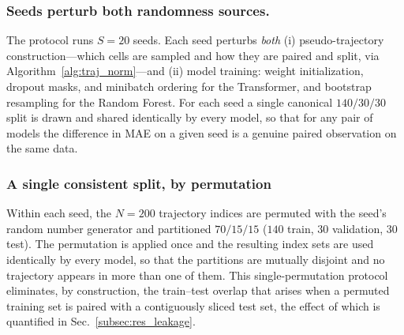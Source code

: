 \documentclass[pdflatex,sn-mathphys-num]{sn-jnl}
\theoremstyle{thmstyleone}%
\theoremstyle{thmstyletwo}%
\theoremstyle{thmstylethree}%
\begin{document}
\subsubsection{Seeds perturb both randomness sources.} The protocol runs $S=20$ seeds. Each seed perturbs \emph{both} (i) pseudo-trajectory construction---which cells are sampled and how they are paired and split, via Algorithm~\ref{alg:traj_norm}---and (ii) model training: weight initialization, dropout masks, and minibatch ordering for the Transformer, and bootstrap resampling for the Random Forest. For each seed a single canonical $140/30/30$ split is drawn and shared identically by every model, so that for any pair of models the difference in MAE on a given seed is a genuine paired observation on the same data.

\subsubsection{A single consistent split, by permutation} Within each seed, the $N=200$ trajectory indices are permuted with the seed's random number generator and partitioned $70/15/15$ ($140$ train, $30$ validation, $30$ test). The permutation is applied once and the resulting index sets are used identically by every model, so that the partitions are mutually disjoint and no trajectory appears in more than one of them. This single-permutation protocol eliminates, by construction, the train–test overlap that arises when a permuted training set is paired with a contiguously sliced test set, the effect of which is quantified in Sec.~\ref{subsec:res_leakage}.
\end{document}
